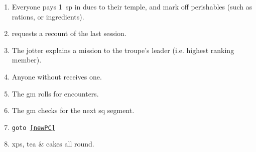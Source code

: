 
\begin{enumerate}
  \item
  Everyone pays 1~\gls{sp} in dues to their temple, and mark off perishables (such as rations, or \glspl{ingredient}).
  \item
   requests a recount of the last session.
  \item
  The \gls{jotter} explains a mission to the troupe's leader (i.e. highest ranking member).
  \item
  Anyone without  receives one.
  \label{newPC}
  \item
  The \gls{gm} rolls for encounters.
  \label{gmRollsEncounters}
  \item
  The \gls{gm} checks for the next \gls{sq} \gls{segment}.
  \item
  {\tt goto \ref{newPC}}
  \item
  \Glspl{xp}, tea \& cakes all round.
\end{enumerate}

